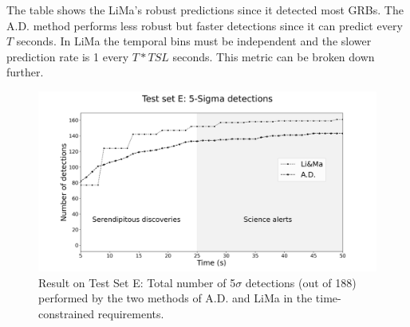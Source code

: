 The table shows the LiMa's robust predictions since it detected most GRBs. The A.D. method performs less robust but faster detections since it can predict every $T$ seconds. In LiMa the temporal bins must be independent and the slower prediction rate is 1  every $T*TSL$ seconds. This metric can be broken down further. 
\begin{figure}[t]
\centering
\includegraphics[width=1\textwidth]{figures/experiments/ad_vs_li_ma_testset_e.png}
\caption{Result on Test Set E: Total number of 5$\sigma$ detections (out of 188) performed by the two methods of A.D. and LiMa in the time-constrained requirements. }
\label{f:ad-vs-lima}
\end{figure}



